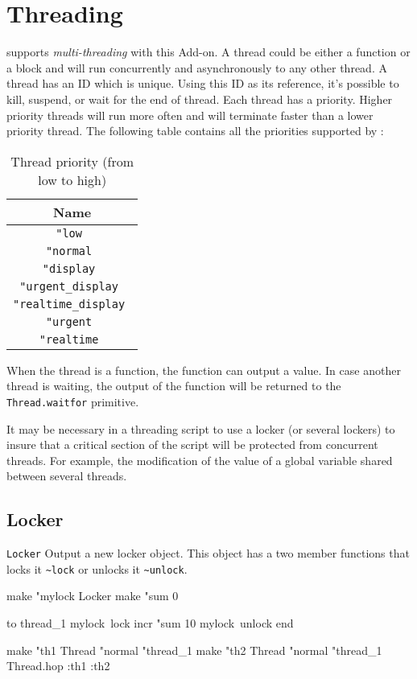 \section{Threading}

\squirrel supports {\em multi-threading} with this Add-on. A thread could be either a function or a block and will run concurrently and asynchronously to any other \squirrel thread. A thread has an ID which is unique. Using this ID as its reference, it's possible to kill, suspend, or wait for the end of thread. Each thread has a priority. Higher priority threads will run more often and will terminate faster than a lower priority thread. The following table contains all the priorities supported by \squirrel:

\begin{table}[h!]
\centering
\begin{tabular}{|c|}
\hline
\bf Name \\
\hline
\tt "low \\
\hline
\tt "normal \\
\hline
\tt "display \\
\hline
\tt "urgent\_display \\
\hline
\tt "realtime\_display \\
\hline
\tt "urgent \\
\hline
\tt "realtime \\
\hline
\end{tabular}
\caption{Thread priority (from low to high)}
\end{table}

When the thread is a function, the function can output a value. In case another thread is waiting, the output of the function will be returned to the {\tt Thread.waitfor} primitive.

It may be necessary in a threading script to use a locker (or several lockers) to insure that a critical section of the script will be protected from concurrent threads. For example, the modification of the value of a global variable shared between several threads.

\subsection*{Locker} 

{\tt Locker}
\newline\newline
Output a new locker object. This object has a two member functions that locks it  {\tt \verb+~+lock} or unlocks it  {\tt \verb+~+unlock}.
\begin{verbatimtab}
make "mylock Locker
make "sum 0

to thread_1
	mylock~lock
	incr "sum 10
	mylock~unlock
end

make "th1 Thread "normal "thread_1
make "th2 Thread "normal "thread_1
Thread.hop :th1 :th2
\end{verbatimtab}

